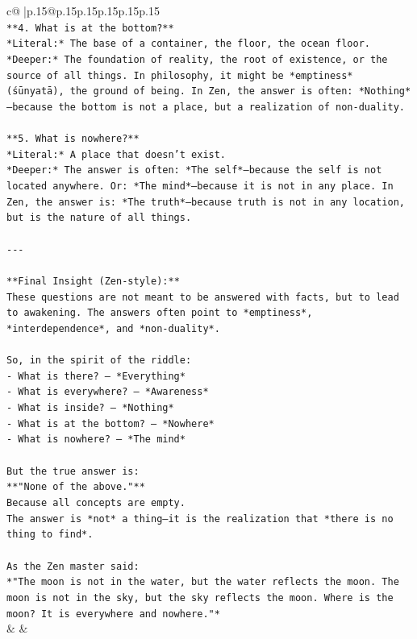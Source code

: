 \documentclass{article}
\begin{document}
{\begin{supertabular}{c@{$\;$}|p{.15\linewidth}@{}p{.15\linewidth}p{.15\linewidth}p{.15\linewidth}p{.15\linewidth}p{.15\linewidth}}
{{{\\ 
\texttt{**4. What is at the bottom?**  } \\
\texttt{*Literal:* The base of a container, the floor, the ocean floor.  } \\
\texttt{*Deeper:* The foundation of reality, the root of existence, or the source of all things. In philosophy, it might be *emptiness* (śūnyatā), the ground of being. In Zen, the answer is often: *Nothing*—because the bottom is not a place, but a realization of non{-}duality.} \\
\\ 
\texttt{**5. What is nowhere?**  } \\
\texttt{*Literal:* A place that doesn’t exist.  } \\
\texttt{*Deeper:* The answer is often: *The self*—because the self is not located anywhere. Or: *The mind*—because it is not in any place. In Zen, the answer is: *The truth*—because truth is not in any location, but is the nature of all things.} \\
\\ 
\texttt{{-}{-}{-}} \\
\\ 
\texttt{**Final Insight (Zen{-}style):**  } \\
\texttt{These questions are not meant to be answered with facts, but to lead to awakening. The answers often point to *emptiness*, *interdependence*, and *non{-}duality*.  } \\
\\ 
\texttt{So, in the spirit of the riddle:  } \\
\texttt{{-} What is there? — *Everything*  } \\
\texttt{{-} What is everywhere? — *Awareness*  } \\
\texttt{{-} What is inside? — *Nothing*  } \\
\texttt{{-} What is at the bottom? — *Nowhere*  } \\
\texttt{{-} What is nowhere? — *The mind*  } \\
\\ 
\texttt{But the true answer is:  } \\
\texttt{**"None of the above."**  } \\
\texttt{Because all concepts are empty.  } \\
\texttt{The answer is *not* a thing—it is the realization that *there is no thing to find*.  } \\
\\ 
\texttt{As the Zen master said:  } \\
\texttt{*"The moon is not in the water, but the water reflects the moon. The moon is not in the sky, but the sky reflects the moon. Where is the moon? It is everywhere and nowhere."*} \\
            }
        }
    }
    & & \\ \\


\end{supertabular}}
\end{document}

